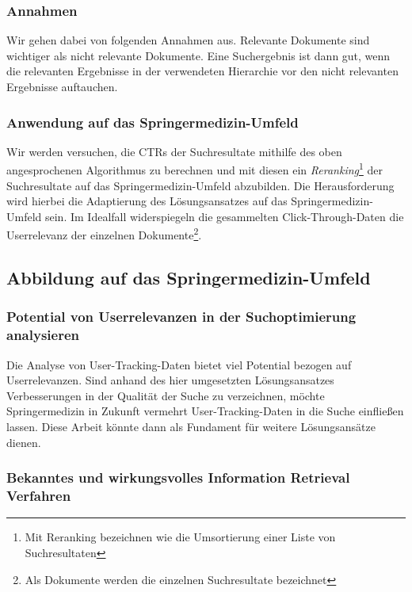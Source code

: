 \subsubsection{Annahmen}
\label{sec:Einfuehrung:ZielArbeit:Suchoptimierung:Annahmen}

Wir gehen dabei von folgenden Annahmen aus. Relevante Dokumente sind wichtiger als nicht relevante Dokumente. Eine Suchergebnis ist dann gut, wenn die relevanten Ergebnisse in der verwendeten Hierarchie vor den nicht relevanten Ergebnisse auftauchen. 

\subsubsection{Anwendung auf das Springermedizin-Umfeld}
\label{sec:Einfuehrung:ZielArbeit:Suchoptimierung:AnwendungSpringermedizin-Umfeld}

Wir werden versuchen, die CTRs der Suchresultate mithilfe des oben angesprochenen Algorithmus zu berechnen und mit diesen ein \textit{Reranking}\footnote{Mit Reranking bezeichnen wie die Umsortierung einer Liste von Suchresultaten} der Suchresultate auf das Springermedizin-Umfeld abzubilden. Die Herausforderung wird hierbei die Adaptierung des Lösungsansatzes auf das Springermedizin-Umfeld sein. Im Idealfall widerspiegeln die gesammelten Click-Through-Daten die Userrelevanz der einzelnen Dokumente\footnote{Als Dokumente werden die einzelnen Suchresultate bezeichnet}.

\subsection{Abbildung auf das Springermedizin-Umfeld}
\label{sec:Einfuehrung:ZielArbeit:AbbildungSpringermedizinUmfeld}

\subsubsection{Potential von Userrelevanzen in der Suchoptimierung analysieren}
\label{sec:Einfuehrung:ZielArbeit:Potential}

Die Analyse von User-Tracking-Daten bietet viel Potential bezogen auf Userrelevanzen. Sind anhand des hier umgesetzten Lösungsansatzes Verbesserungen in der Qualität der Suche zu verzeichnen, möchte Springermedizin in Zukunft vermehrt User-Tracking-Daten in die Suche einfließen lassen. Diese Arbeit könnte dann als Fundament für weitere Lösungsansätze dienen.

\subsubsection{Bekanntes und wirkungsvolles Information Retrieval Verfahren}
\label{sec:Einfuehrung:ZielArbeit:AbbildungSpringermedizinUmfeld:InformationRetrievalVerfahren}

